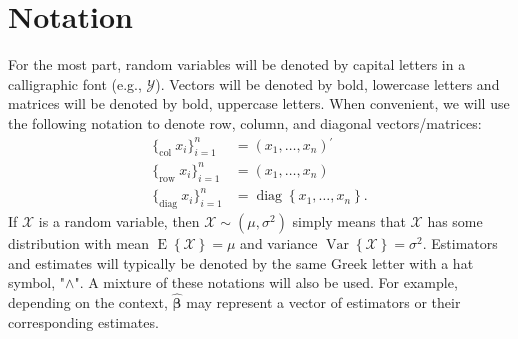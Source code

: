 \documentclass[cmfont,usenames,dvipsnames,leqno]{afit-etd}\usepackage[]{graphicx}\usepackage[]{color}
\newcommand{\trans}{\ensuremath{^\prime}}
\newcommand{\mc}[1]{\ensuremath{\mathcal{#1}}}
\newcommand{\wh}[1]{\ensuremath{\widehat{#1}}}
\newcommand{\E}{\operatorname{E}}
\newcommand{\var}{\operatorname{Var}}
\newcommand{\diag}{\operatorname{diag}}
\begin{document}
\section{Notation}
\label{sec:notation}
For the most part, random variables will be denoted by capital letters in a calligraphic font (e.g., $\mc{Y}$). Vectors will be denoted by bold, lowercase letters and matrices will be denoted by bold, uppercase letters. When convenient, we will use the following notation to denote row, column, and diagonal vectors/matrices:
\begin{align*}
  \Big\lbrace_\text{col } x_i \Big\rbrace_{i = 1}^n &= (x_1, \dotsc, x_n)\trans \\
  \Big\lbrace_\text{row } x_i \Big\rbrace_{i = 1}^n &= (x_1, \dotsc, x_n)  \\
  \Big\lbrace_\text{diag } x_i \Big\rbrace_{i = 1}^n &= \diag\left\{x_1, \dotsc, x_n\right\}.
\end{align*}
If $\mc{X}$ is a random variable, then $\mc{X} \sim (\mu, \sigma^2)$ simply means that $\mc{X}$ has some distribution with mean $\E\left\{\mc{X}\right\} = \mu$ and variance $\var\left\{\mc{X}\right\} = \sigma^2$. Estimators and estimates will typically be denoted by the same Greek letter with a hat symbol, "$\wedge$". A mixture of these notations will also be used. For example, depending on the context, $\wh{\bm{\beta}}$ may represent a vector of estimators or their corresponding estimates.
\end{document}
